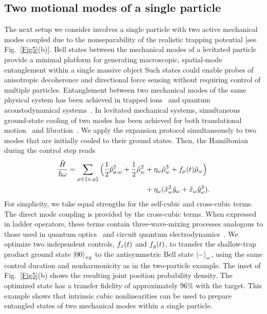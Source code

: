\documentclass[reprint,prx,footinbib,floatfix,twocolumn,longbibliography,superscriptaddress]{revtex4-2}
\begin{document}
\subsection{Two motional modes of a single particle}
The next setup we consider involves a single particle with two active mechanical modes coupled due to the nonseparability of the realistic trapping potential [see Fig.~\ref{Fig5}(b)].
Bell states between the mechanical modes of a levitated particle provide a minimal platform for generating macroscopic, spatial-mode entanglement within a single massive object
Such states could enable probes of anisotropic decoherence and directional force sensing without requiring control of multiple particles.
Entanglement between two mechanical modes of the same physical system has been achieved in trapped ions~\cite{Jeon2024,Matsos2025,Fontbote-Schmidt2026} and quantum acoustodynamical systems~\cite{Wollack2022,vonLupke2024}.
In levitated mechanical systems, simultaneous ground-state cooling of two modes has been achieved for both translational motion~\cite{Piotrowski2023,Deplano2025} and libration~\cite{Troyer2026}.
We apply the expansion protocol simultaneously to two modes that are initially cooled to their ground states.
Then, the Hamiltonian during the control step reads
\begin{align}
    \frac{\hat{H}}{\hbar \omega} = \sum_{\mu \in \{x,y\}} \Big( \frac{1}{2} \hat{p}_{\mu,\omega}^2 + \frac{1}{2} \hat{\mu}_{\omega}^2 &+ \eta_{\omega} \hat{\mu}_{\omega}^3  + f_\mu(t)\hat{\mu}_{ \omega}  \Big) \nonumber \\ 
    &+ \eta_{\omega} ( \hat{x}_{\omega}^2 \hat{y}_{\omega} + \hat{x}_{\omega} \hat{y}_{\omega}^2).
\end{align}
For simplicity, we take equal strengths for the self-cubic and cross-cubic terms.
The direct mode coupling is provided by the cross-cubic terms.
When expressed in ladder operators, these terms contain three-wave-mixing processes analogous to those used in quantum optics~\cite{Boyd2008} and circuit quantum electrodynamics~\cite{Frattini2017,Sivak2019}.
We optimize two independent controls, $f_x(t)$ and $f_y(t)$, to transfer the shallow-trap product ground state $\ket{00}_{x y}$ to the antisymmetric Bell state $\ket{-}_\omega$, using the same control duration and nonharmonicity as in the two-particle example.
The inset of Fig.~\ref{Fig5}(b) shows the resulting joint position probability density.
The optimized state has a transfer fidelity of approximately 96$\%$ with the target.
This example shows that intrinsic cubic nonlinearities can be used to prepare entangled states of two mechanical modes within a single particle.
\end{document}

